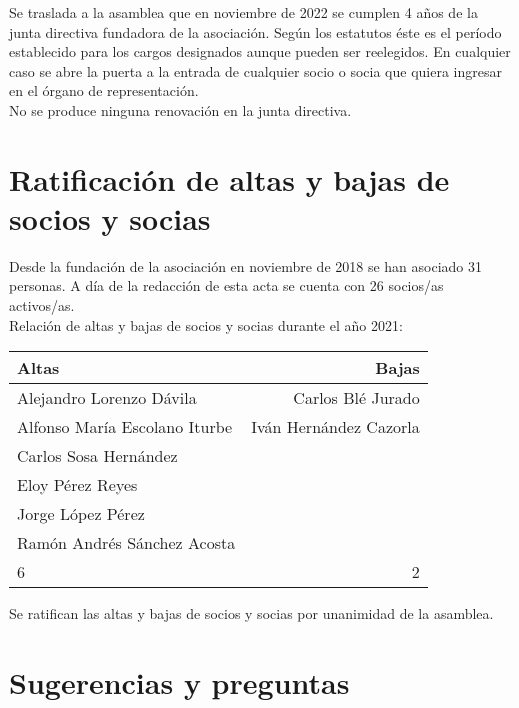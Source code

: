 \documentclass[a4paper,12pt]{article}
\begin{document}
Se traslada a la asamblea que en noviembre de 2022 se cumplen 4 años de la junta directiva fundadora de la asociación. Según los estatutos éste es el período establecido para los cargos designados aunque pueden ser reelegidos. En cualquier caso se abre la puerta a la entrada de cualquier socio o socia que quiera ingresar en el órgano de representación.\\

No se produce ninguna renovación en la junta directiva.

\section{Ratificación de altas y bajas de socios y socias}

Desde la fundación de la asociación en noviembre de 2018 se han asociado 31 personas. A día de la redacción de esta acta se cuenta con 26 socios/as activos/as.\\

Relación de altas y bajas de socios y socias durante el año 2021:

\begin{center}
    \begin{tabular}{ | l | r | }
        \hline
        \textbf{Altas} & \textbf{Bajas} \\ 
        \hline
        \hline
        Alejandro Lorenzo Dávila & Carlos Blé Jurado \\  
        \hline
        Alfonso María Escolano Iturbe & Iván Hernández Cazorla \\  
        \hline
        Carlos Sosa Hernández & \\  
        \hline
        Eloy Pérez Reyes & \\  
        \hline
        Jorge López Pérez & \\  
        \hline
        Ramón Andrés Sánchez Acosta & \\  
        \hline
        \hline
        6 & 2 \\  
        \hline
    \end{tabular}
\end{center}

Se ratifican las altas y bajas de socios y socias por unanimidad de la asamblea.

\section{Sugerencias y preguntas}
\end{document}
